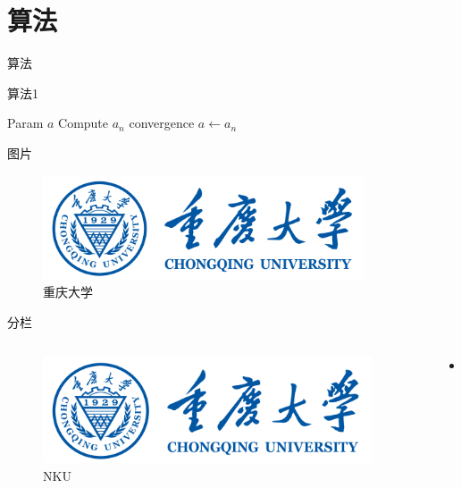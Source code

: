 \section{算法}

\begin{frame}{算法}
    \begin{algorithm}[H]
        \caption{算法1}\label{alg:em}
        \begin{algorithmic}[1]
            \REQUIRE Param
            \ENSURE $a$
            \REPEAT
            \STATE Compute $a_n$
            \UNTIL convergence
            \RETURN $a\leftarrow a_n$
        \end{algorithmic}
    \end{algorithm}    
\end{frame}

\begin{frame}{图片}
    \begin{figure}
        \centering
        \includegraphics[width=0.85\textwidth]{figure/cqu_logo.png}
        \caption{重庆大学}\label{fig:nk}
    \end{figure}
\end{frame}

\begin{frame}{分栏}
    \begin{columns}
        \begin{column}{0.3\textwidth}
            \begin{figure}
                \centering
                \includegraphics[width=0.95\textwidth]{figure/cqu_logo.png}
                \caption{NKU}\label{fig:nku}
            \end{figure}
        \end{column}
        \begin{column}{0.7\textwidth}
            \begin{itemize}
                \item ...
            \end{itemize}
        \end{column}
    \end{columns}
\end{frame}

